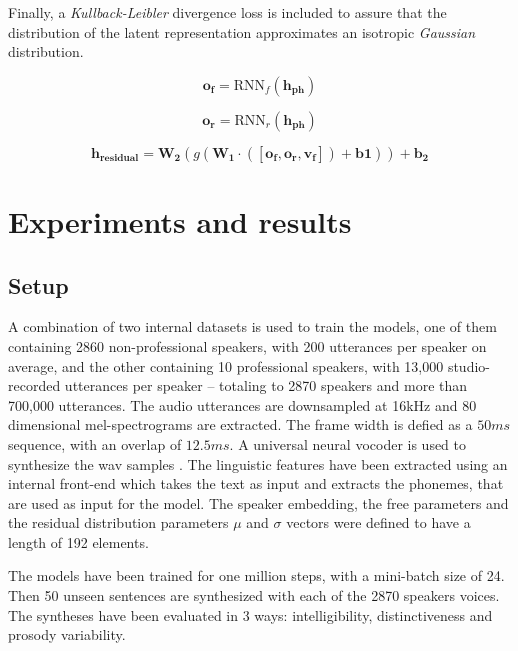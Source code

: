 Finally, a \textit{Kullback-Leibler} divergence loss is included to assure that the distribution of the latent representation approximates an isotropic \textit{Gaussian} distribution.

\begin{equation}
 \label{eq:rnn1}
\mathbf{o_f} = \text{RNN}_f(\mathbf{h_{ph}})
\end{equation}

\begin{equation}
 \label{eq:rnn2}
\mathbf{o_r} = \text{RNN}_r(\mathbf{h_{ph}})
\end{equation}

\begin{equation}
 \label{eq:residual}
\mathbf{h_{residual}} = \mathbf{W_2}(g(\mathbf{W_1}\cdot([\mathbf{o_f}, \mathbf{o_r}, \mathbf{v_f}]) + \mathbf{b1} )) +\mathbf{ b_2}
\end{equation}

\section{Experiments and results}
\subsection{Setup}
 A combination of two internal datasets is used to train the models, one of them containing 2860 non-professional speakers, with 200 utterances per speaker on average, and the other containing 10 professional speakers, with 13,000 studio-recorded utterances per speaker – totaling to 2870 speakers and more than 700,000 utterances. The audio utterances are downsampled at 16kHz and 80 dimensional mel-spectrograms are extracted. The frame width is defied as a $50ms$ sequence, with an overlap of $12.5ms$. A universal neural vocoder is used to synthesize the wav samples \autocite{lorenzotrueba2019}. The linguistic features have been extracted using an internal front-end which takes the text as input and extracts the phonemes, that are used as input for the model. The speaker embedding, the free parameters and the residual distribution parameters $\mu$ and $\sigma$ vectors were defined to have a length of 192 elements.

 The models have been trained for one million steps, with a mini-batch size of 24. Then 50 unseen sentences are synthesized with each of the 2870 speakers voices. The syntheses have been evaluated in 3 ways: intelligibility, distinctiveness and prosody variability.

